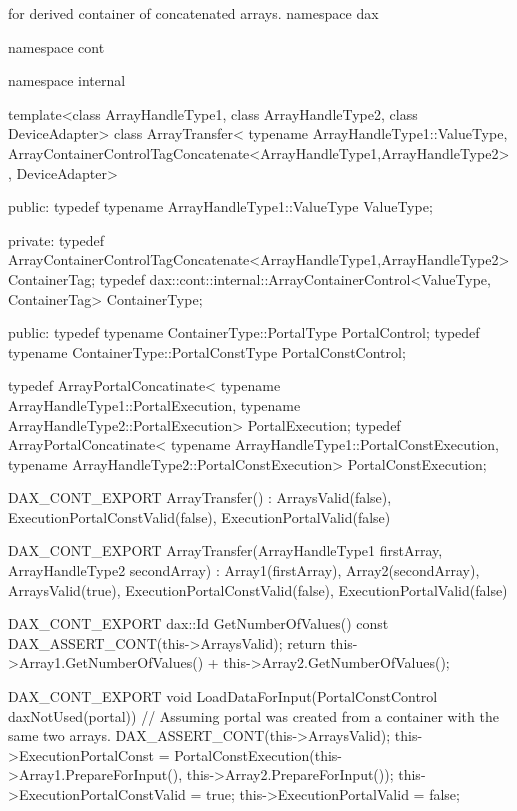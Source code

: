 \begin{daxexample}[ex:DerivedArrayTransfer]{ for derived container of concatenated arrays.}
namespace dax {
namespace cont {
namespace internal {

template<class ArrayHandleType1,
         class ArrayHandleType2,
         class DeviceAdapter>
class ArrayTransfer<
    typename ArrayHandleType1::ValueType,
    ArrayContainerControlTagConcatenate<ArrayHandleType1,ArrayHandleType2>,
    DeviceAdapter>
{
public:
  typedef typename ArrayHandleType1::ValueType ValueType;

private:
  typedef
  ArrayContainerControlTagConcatenate<ArrayHandleType1,ArrayHandleType2>
    ContainerTag;
  typedef dax::cont::internal::ArrayContainerControl<ValueType, ContainerTag> ContainerType;

public:
  typedef typename ContainerType::PortalType PortalControl;
  typedef typename ContainerType::PortalConstType PortalConstControl;

  typedef ArrayPortalConcatinate<
      typename ArrayHandleType1::PortalExecution,
      typename ArrayHandleType2::PortalExecution> PortalExecution;
  typedef ArrayPortalConcatinate<
      typename ArrayHandleType1::PortalConstExecution,
      typename ArrayHandleType2::PortalConstExecution> PortalConstExecution;

  DAX_CONT_EXPORT
  ArrayTransfer()
    : ArraysValid(false),
      ExecutionPortalConstValid(false),
      ExecutionPortalValid(false)
  {  }

  DAX_CONT_EXPORT
  ArrayTransfer(ArrayHandleType1 firstArray,
                ArrayHandleType2 secondArray)
    : Array1(firstArray),
      Array2(secondArray),
      ArraysValid(true),
      ExecutionPortalConstValid(false),
      ExecutionPortalValid(false)
  {  }

  DAX_CONT_EXPORT
  dax::Id GetNumberOfValues() const {
    DAX_ASSERT_CONT(this->ArraysValid);
    return this->Array1.GetNumberOfValues() + this->Array2.GetNumberOfValues();
  }

  DAX_CONT_EXPORT
  void LoadDataForInput(PortalConstControl daxNotUsed(portal)) {
    // Assuming portal was created from a container with the same two arrays.
    DAX_ASSERT_CONT(this->ArraysValid);
    this->ExecutionPortalConst = PortalConstExecution(this->Array1.PrepareForInput(),
                                                      this->Array2.PrepareForInput());
    this->ExecutionPortalConstValid = true;
    this->ExecutionPortalValid = false;
  }

}}}}
\end{daxexample}
